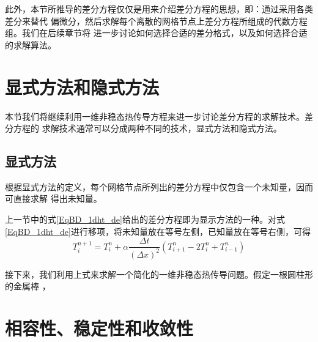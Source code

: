 此外，本节所推导的差分方程仅仅是用来介绍差分方程的思想，即：通过采用各类差分来替代
偏微分，然后求解每个离散的网格节点上差分方程所组成的代数方程组。我们在后续章节将
进一步讨论如何选择合适的差分格式，以及如何选择合适的求解算法。

\section{显式方法和隐式方法}
本节我们将继续利用一维非稳态热传导方程来进一步讨论差分方程的求解技术。差分方程的
求解技术通常可以分成两种不同的技术，显式方法和隐式方法。

\subsection{显式方法}
根据显式方法的定义，每个网格节点所列出的差分方程中仅包含一个未知量，因而可直接求解
得出未知量。

上一节中的式\eqref{EqBD_1dht_de}给出的差分方程即为显示方法的一种。对式
\eqref{EqBD_1dht_de}进行移项，将未知量放在等号左侧，已知量放在等号右侧，可得
\begin{equation}
  T_{i}^{n+1}
  =
  T_{i}^{n}
  +
  \alpha\frac{\Delta t}{(\Delta x)^{2}}
  \left(
    T_{i+1}^{n} - 2T_{i}^{n} + T_{i-1}^{n}
  \right)
\end{equation}

接下来，我们利用上式来求解一个简化的一维非稳态热传导问题。假定一根圆柱形的金属棒
，


\section{相容性、稳定性和收敛性}

